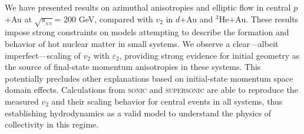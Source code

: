 \documentclass[%
reprint,
showpacs,preprintnumbers,
 amsmath,amssymb,
 aps,
]{revtex4-1}
\newcommand{\sqsn}{\mbox{$\sqrt{s_{_{NN}}}$}\xspace}
\newcommand{\dau}{\mbox{$d$+Au}\xspace}
\newcommand{\pau}{\mbox{$p$+Au}\xspace}
\newcommand{\hau}{\mbox{$^3\text{He}$+Au}\xspace}
\begin{document}
We have presented results on azimuthal anisotropies and elliptic flow in central \pau at \sqsn = 200 GeV, compared with $v_2$ in \dau and \hau. These results impose strong constraints on models attempting to describe the formation and behavior of hot nuclear matter in small systems. We observe a clear---albeit imperfect---scaling of $v_2$ with $\varepsilon_2$, providing strong evidence for initial geometry as the source of final-state momentum anisotropies in these systems. This potentially precludes other explanations based on initial-state momentum space domain effects. Calculations from \textsc{sonic} and \textsc{supersonic} are able to reproduce the measured $v_2$ and their scaling behavior for central events in all systems, thus establishing hydrodynamics as a valid model to understand the physics of collectivity in this regime. 


\end{document}
